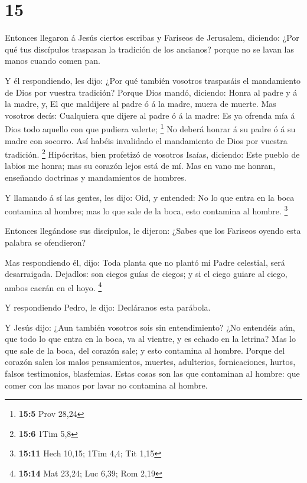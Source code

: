 \hypertarget{section-14}{%
\section{15}\label{section-14}}

 Entonces llegaron á Jesús ciertos escribas y Fariseos de
Jerusalem, diciendo:  ¿Por qué tus discípulos traspasan la
tradición de los ancianos? porque no se lavan las manos cuando comen
pan.

 Y él respondiendo, les dijo: ¿Por qué también vosotros
traspasáis el mandamiento de Dios por vuestra tradición? 
Porque Dios mandó, diciendo: Honra al padre y á la madre, y, El que
maldijere al padre ó á la madre, muera de muerte.  Mas
vosotros decís: Cualquiera que dijere al padre ó á la madre: Es ya
ofrenda mía á Dios todo aquello con que pudiera valerte; \footnote{\textbf{15:5}
  Prov 28,24}  No deberá honrar á su padre ó á su madre con
socorro. Así habéis invalidado el mandamiento de Dios por vuestra
tradición. \footnote{\textbf{15:6} 1Tim 5,8}  Hipócritas,
bien profetizó de vosotros Isaías, diciendo:  Este pueblo de
labios me honra; mas su corazón lejos está de mí.  Mas en
vano me honran, enseñando doctrinas y mandamientos de hombres.

 Y llamando á sí las gentes, les dijo: Oid, y entended:
 No lo que entra en la boca contamina al hombre; mas lo que
sale de la boca, esto contamina al hombre. \footnote{\textbf{15:11} Hech
  10,15; 1Tim 4,4; Tit 1,15}

 Entonces llegándose sus discípulos, le dijeron: ¿Sabes que
los Fariseos oyendo esta palabra se ofendieron?

 Mas respondiendo él, dijo: Toda planta que no plantó mi
Padre celestial, será desarraigada.  Dejadlos: son ciegos
guías de ciegos; y si el ciego guiare al ciego, ambos caerán en el hoyo.
\footnote{\textbf{15:14} Mat 23,24; Luc 6,39; Rom 2,19}

 Y respondiendo Pedro, le dijo: Decláranos esta parábola.

 Y Jesús dijo: ¿Aun también vosotros sois sin
entendimiento?  ¿No entendéis aún, que todo lo que entra en
la boca, va al vientre, y es echado en la letrina?  Mas lo
que sale de la boca, del corazón sale; y esto contamina al hombre.
 Porque del corazón salen los malos pensamientos, muertes,
adulterios, fornicaciones, hurtos, falsos testimonios, blasfemias.
 Estas cosas son las que contaminan al hombre: que comer
con las manos por lavar no contamina al hombre.

